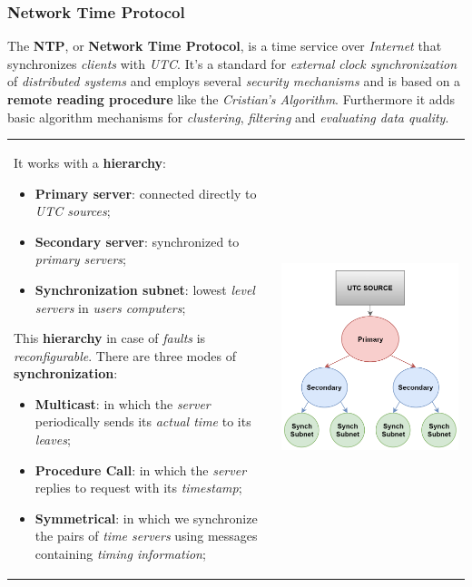 \documentclass{article}
\begin{document}
\subsubsection{Network Time Protocol}
The \textbf{NTP}, or \textbf{Network Time Protocol}, is a time service over \emph{Internet} that synchronizes \emph{clients} with \emph{UTC}. It's a standard for \emph{external clock synchronization} of \emph{distributed systems} and employs several \emph{security mechanisms} and is based on a \textbf{remote reading procedure} like the \emph{Cristian's Algorithm}. Furthermore it adds basic algorithm mechanisms for \emph{clustering}, \emph{filtering} and \emph{evaluating data quality}.
\clearpage
\hfill \break
\begin{tabular}{C{10.5cm}  L{6cm}}
It works with a \textbf{hierarchy}:
\begin{itemize}
\item \textbf{Primary server}: connected directly to \emph{UTC sources};
\item \textbf{Secondary server}: synchronized to \emph{primary servers};
\item \textbf{Synchronization subnet}: lowest \emph{level servers} in \emph{users computers};
\end{itemize}
This \textbf{hierarchy} in case of \emph{faults} is \emph{reconfigurable}. There are three modes of \textbf{synchronization}:
\begin{itemize}
\item \textbf{Multicast}: in which the \emph{server} periodically sends its \emph{actual time} to its \emph{leaves};
\item \textbf{Procedure Call}: in which the \emph{server} replies to request with its \emph{timestamp};
\item \textbf{Symmetrical}: in which we synchronize the pairs of \emph{time servers} using messages containing \emph{timing information};
\end{itemize}
& \includegraphics[scale=0.7]{cattura14.png}
\end{tabular}
\end{document}
